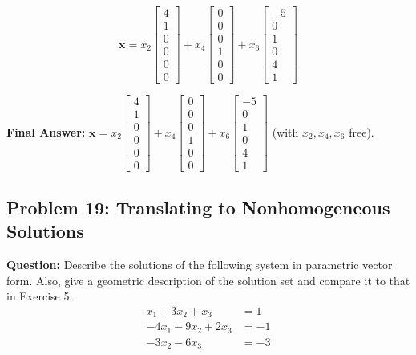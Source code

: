 \documentclass[11pt]{article}
\begin{document}
\begin{enumerate}
\[    \mathbf{x} = x_2 \begin{bmatrix} 4 \\ 1 \\ 0 \\ 0 \\ 0 \\ 0 \end{bmatrix} + x_4 \begin{bmatrix} 0 \\ 0 \\ 0 \\ 1 \\ 0 \\ 0 \end{bmatrix} + x_6 \begin{bmatrix} -5 \\ 0 \\ 1 \\ 0 \\ 4 \\ 1 \end{bmatrix}
    \]
\end{enumerate}
\textbf{Final Answer:} 
$\mathbf{x} = x_2 \begin{bmatrix} 4 \\ 1 \\ 0 \\ 0 \\ 0 \\ 0 \end{bmatrix} + x_4 \begin{bmatrix} 0 \\ 0 \\ 0 \\ 1 \\ 0 \\ 0 \end{bmatrix} + x_6 \begin{bmatrix} -5 \\ 0 \\ 1 \\ 0 \\ 4 \\ 1 \end{bmatrix}$ (with $x_2, x_4, x_6$ free).

\subsection*{Problem 19: Translating to Nonhomogeneous Solutions}
\textbf{Question:} Describe the solutions of the following system in parametric vector form. Also, give a geometric description of the solution set and compare it to that in Exercise 5.
\begin{align*}
    x_1 + 3x_2 + x_3 &= 1 \\
    -4x_1 - 9x_2 + 2x_3 &= -1 \\
    -3x_2 - 6x_3 &= -3
\end{align*}
\end{document}
